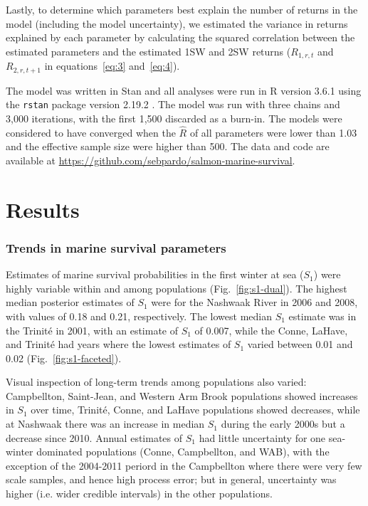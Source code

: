 \documentclass[12pt]{article}
\newcommand{\So}{$S_{1}$\xspace}
\begin{document}
Lastly, to determine which parameters best explain the number of returns in
the model (including the model uncertainty), we estimated the variance in returns explained by each parameter by
calculating the squared correlation between the estimated parameters and the
estimated 1SW and 2SW returns ($R_{1,r,t}$ and $R_{2,r,t+1}$ in
equations~\ref{eq:3} and~\ref{eq:4}).

The model was written in Stan \citep{Carpenter2017} and all analyses were run in R version 3.6.1
\citep{RCoreTeam2019} using the \texttt{rstan} package version 2.19.2
\citep{StanDevelopmentTeam2019}.
The model was run with three chains and 3,000 iterations, with the first 1,500
discarded as a burn-in. The models were considered to have converged when the
$\hat R$ of all parameters were lower than 1.03 and the effective sample size
were higher than 500. The data and code are available at \url{https://github.com/sebpardo/salmon-marine-survival}.



\section*{Results}


\subsubsection*{Trends in marine survival parameters}

Estimates of marine survival probabilities in the first winter at sea (\So) were
highly variable within and among populations
(Fig.~\ref{fig:s1-dual}). The highest median posterior estimates of \So
were for the Nashwaak River in 2006 and 2008, with values of 0.18 and 0.21,
respectively. The lowest median \So estimate was in the Trinit\'{e} in 2001,
with an estimate of \So of 0.007, while the Conne, LaHave, and Trinit\'{e} had
years where the lowest estimates of \So varied between 0.01 and 0.02 (Fig.~\ref{fig:s1-faceted}).

Visual inspection of long-term trends among populations also varied: Campbellton,
Saint-Jean, and Western Arm Brook populations showed increases in \So
over time, Trinit\'{e}, Conne, and LaHave populations showed decreases,
while at Nashwaak there was an increase in median \So during the early
2000s but a decrease since 2010. Annual estimates of \So had little
uncertainty for one sea-winter dominated populations (Conne, Campbellton, and
WAB), with the exception of the 2004-2011 periord in the Campbellton where
there were very few scale samples, and hence high process error; but in general,
uncertainty was higher (i.e. wider credible intervals) in the other
populations.
\end{document}
